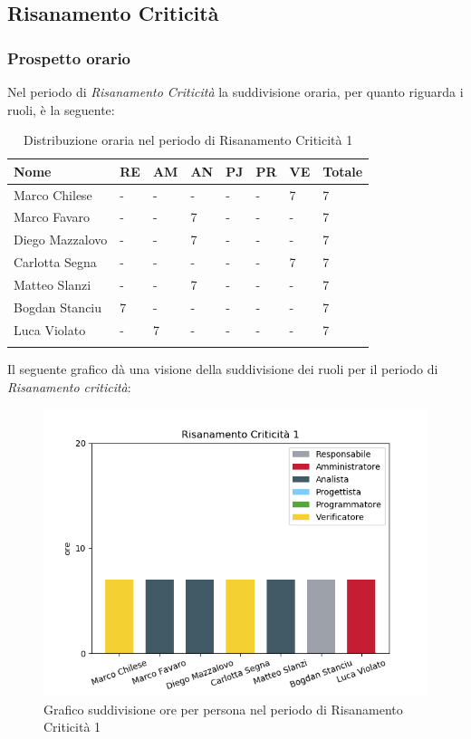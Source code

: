 \subsection{Risanamento Criticità}
\subsubsection{Prospetto orario}

Nel periodo di \textit{Risanamento Criticità} la suddivisione oraria, per quanto riguarda i ruoli, è la seguente:

\begin{longtable}{|C{.30\textwidth}|C{.06\textwidth}|C{.06\textwidth}|C{.06\textwidth} | C{.06\textwidth}| C{.06\textwidth} | C{.06\textwidth} | C{.10\textwidth} |}
\hline
\textbf{Nome} & \textbf{RE} & \textbf{AM} & \textbf{AN} & \textbf{PJ} & \textbf{PR} & \textbf{VE} & \textbf{Totale}\\
\hline 
Marco Chilese & - & - & - & - & - & 7 & 7 \\
\hline
Marco Favaro & - & - & 7 & - & - & - & 7 \\
\hline
Diego Mazzalovo & - & - & 7 & - & - & - & 7 \\
\hline
Carlotta Segna & - & - & - & - & - & 7 & 7 \\
\hline
Matteo Slanzi & - & - & 7 & - & - & - & 7 \\
\hline
Bogdan Stanciu & 7 & - & - & - & - & - & 7 \\
\hline
Luca Violato & - & 7 & - & - & - & - & 7 \\
\hline

\caption{Distribuzione oraria nel periodo di Risanamento Criticità 1}
\label{Distribuzione oraria del periodo di rc1}
\end{longtable}



Il seguente grafico dà una visione della suddivisione dei ruoli per il periodo di \textit{Risanamento criticità}:
\begin{figure}[H]
  \centering
  \includegraphics[width=1\linewidth]{./images/fig_rc1.png}
  \caption{Grafico suddivisione ore per persona nel periodo di Risanamento Criticità 1}
  \label{fig:grafico suddivione ruoli rc1}
\end{figure}


